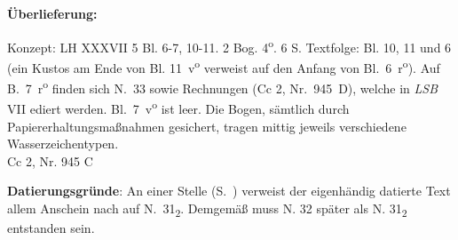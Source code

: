 \begin{ledgroupsized}[r]{120mm}
\footnotesize
\pstart
\noindent\textbf{\"{U}berlieferung:}
\pend
\end{ledgroupsized}            
\begin{ledgroupsized}[r]{114mm}
\footnotesize
\pstart \parindent -6mm
Konzept: LH XXXVII 5 Bl. 6-7, 10-11. 2 Bog. 4\textsuperscript{o}. 6 S. Textfolge: Bl. 10, 11 und 6 (ein Kustos am Ende von Bl. 11~v\textsuperscript{o} verweist auf den Anfang von Bl.~6~r\textsuperscript{o}). Auf B.~7~r\textsuperscript{o} finden sich N.~33 sowie Rechnungen (Cc 2, Nr.~945~D), welche in \textit{LSB} VII ediert werden. Bl.~7~v\textsuperscript{o} ist leer. Die Bogen, s\"{a}mtlich durch Papiererhaltungsma{\ss}nahmen gesichert, tragen mittig jeweils verschiedene Wasserzeichentypen. \\Cc 2, Nr. 945 C
\pend
\end{ledgroupsized}

\vspace*{5mm}
\begin{ledgroup}
\footnotesize 
\pstart
\noindent\footnotesize{\textbf{Datierungsgr\"{u}nde}: An einer Stelle (S.~) verweist der eigenh\"{a}ndig datierte Text allem Anschein nach auf N.~31\textsubscript{2}. Demgem\"{a}{\ss} muss N. 32 sp\"{a}ter als N. 31\textsubscript{2} entstanden sein.}
\pend
\end{ledgroup}

